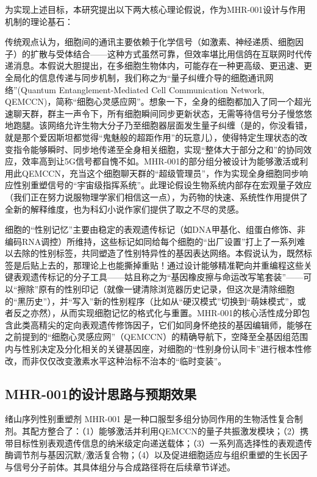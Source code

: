 为实现上述目标，本研究提出以下两大核心理论假说，作为MHR-001设计与作用机制的理论基石：

传统观点认为，细胞间的通讯主要依赖于化学信号（如激素、神经递质、细胞因子）的扩散与受体结合——这种方式虽然可靠，但效率堪比用信鸽在互联网时代传递消息。本假说大胆提出，在多细胞生物体内，可能存在一种更高级、更迅速、更全局化的信息传递与同步机制，我们称之为“量子纠缠介导的细胞通讯网络”(Quantum Entanglement-Mediated Cell Communication Network, QEMCCN)，简称“细胞心灵感应网”。想象一下，全身的细胞都加入了同一个超光速聊天群，群主一声令下，所有细胞瞬间同步更新状态，无需等待信号分子慢悠悠地跑腿。该网络允许生物大分子乃至细胞器层面发生量子纠缠（是的，你没看错，就是那个爱因斯坦都觉得“鬼魅般的超距作用”的玩意儿），使得特定生理状态的改变指令能够瞬时、同步地传递至全身相关细胞，实现“整体大于部分之和”的协同效应，效率高到让5G信号都自愧不如。MHR-001的部分组分被设计为能够激活或利用此QEMCCN，充当这个细胞聊天群的“超级管理员”，作为实现全身细胞同步响应性别重塑信号的“宇宙级指挥系统”。此理论假设生物系统内部存在宏观量子效应（我们正在努力说服物理学家们相信这一点），为药物的快速、系统性作用提供了全新的解释维度，也为科幻小说作家们提供了取之不尽的灵感。

细胞的“性别记忆”主要由稳定的表观遗传标记（如DNA甲基化、组蛋白修饰、非编码RNA调控）所维持，这些标记如同给每个细胞的“出厂设置”打上了一系列难以去除的性别标签，共同塑造了性别特异性的基因表达网络。本假说认为，既然标签是后贴上去的，那理论上也能撕掉重贴！通过设计能够精准靶向并重编程这些关键表观遗传标记的分子工具——姑且称之为“基因橡皮擦与命运改写笔套装”——可以“擦除”原有的性别印记（就像一键清除浏览器历史记录，但这次是清除细胞的“黑历史”），并“写入”新的性别程序（比如从“硬汉模式”切换到“萌妹模式”，或者反之亦然），从而实现细胞记忆的格式化与重置。MHR-001的核心活性成分即包含此类高精尖的定向表观遗传修饰因子，它们如同身怀绝技的基因编辑师，能够在之前提到的“细胞心灵感应网”（QEMCCN）的精确导航下，空降至全基因组范围内与性别决定及分化相关的关键基因座，对细胞的“性别身份认同卡”进行根本性修改，而非仅仅改变激素水平这种治标不治本的“临时变装”。

\subsection{MHR-001的设计思路与预期效果}

绪山序列性别重塑剂 MHR-001 是一种口服型多组分协同作用的生物活性复合制剂。其配方整合了：（1）能够激活并利用QEMCCN的量子共振激发模块；（2）携带目标性别表观遗传信息的纳米级定向递送载体；（3）一系列高选择性的表观遗传酶调节剂与基因沉默/激活复合物；（4）以及促进细胞适应与组织重塑的生长因子与信号分子前体。其具体组分与合成路径将在后续章节详述。

